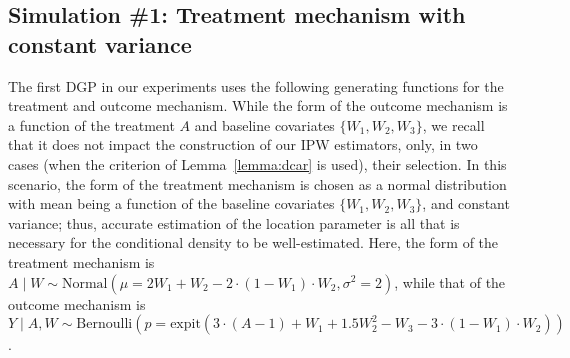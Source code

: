 \subsection{Simulation \#1: Treatment mechanism with constant
  variance}\label{hose_sim_norm}

The first DGP in our experiments uses the following generating functions for the
treatment and outcome mechanism. While the form of the outcome mechanism is a
function of the treatment $A$ and baseline covariates $\{W_1, W_2, W_3\}$, we
recall that it does not impact the construction of our IPW estimators, only, in
two cases (when the criterion of Lemma~\ref{lemma:dcar} is used), their
selection. In this scenario, the form of the treatment mechanism is chosen as
a normal distribution with mean being a function of the baseline covariates
$\{W_1, W_2, W_3\}$, and constant variance; thus, accurate estimation of the
location parameter is all that is necessary for the conditional density to be
well-estimated. Here, the form of the treatment mechanism is
$A \mid W \sim \text{Normal}\left(\mu = 2 W_1 + W_2 - 2 \cdot (1 - W_1) \cdot
W_2, \sigma^2 = 2 \right)$, while that of the outcome mechanism is $Y \mid A, W
\sim \text{Bernoulli}\left(p = \text{expit}(3 \cdot (A - 1) + W_1 + 1.5 W_2^2 -
W_3 - 3 \cdot (1 - W_1) \cdot W_2) \right)$.

